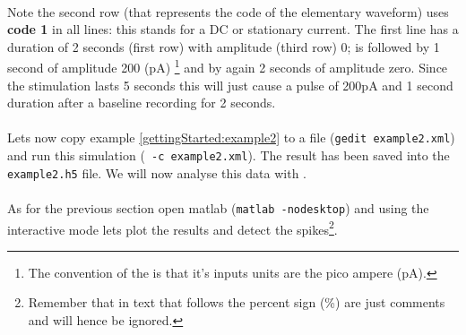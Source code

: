  \paragraph{}
 Note the second row (that represents the code of the elementary waveform) uses \textbf{code 1} in all lines: this stands for a DC or stationary current.
 The first line has a duration of 2 seconds (first row) with amplitude (third row) 0; is followed by 1 second of amplitude 200 (pA) \footnote{The convention of the  is that it's inputs units are the pico ampere (pA).} and by again 2 seconds of amplitude zero. Since the stimulation lasts 5 seconds this will just cause a pulse of 200pA and 1 second duration after a baseline recording for 2 seconds. 
 
 \paragraph{}
 Lets now copy example \ref{gettingStarted:example2} to a file (\texttt{gedit example2.xml}) and run this simulation (\texttt{\progname\ -c example2.xml}).
 The result has been saved into the \texttt{example2.h5} file. We will now analyse this data with \matlab.
 
 \paragraph{}
 As for the previous section open matlab (\texttt{matlab -nodesktop}) and using the interactive mode lets plot the results and detect the spikes\footnote{Remember that in \matlab text that follows the percent sign (\%) are just comments and will hence be ignored.}.
 
